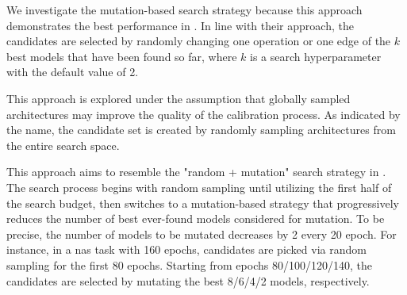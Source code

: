 \begin{description}[leftmargin=0cm, itemsep=1pt]
\item[Mutation] We investigate the mutation-based search strategy because this approach demonstrates the best performance in \cite{white2019bananas}. In line with their approach, the candidates are selected by randomly changing one operation or one edge of the $k$ best models that have been found so far, where $k$ is a search hyperparameter with the default value of 2. 
\item[Random Sampling] This approach is explored under the assumption that globally sampled architectures may improve the quality of the calibration process. As indicated by the name, the candidate set is created by randomly sampling architectures from the entire search space.
\item[Dynamic] This approach aims to resemble the "random + mutation" search strategy in \cite{white2019bananas}. The search process begins with random sampling until utilizing the first half of the search budget, then switches to a mutation-based strategy that progressively reduces the number of best ever-found models considered for mutation. To be precise, the number of models to be mutated decreases by 2 every 20 epoch. For instance, in a \gls{nas} task with 160 epochs, candidates are picked via random sampling for the first 80 epochs. Starting from epochs 80/100/120/140, the candidates are selected by mutating the best 8/6/4/2 models, respectively.
\end{description} 

